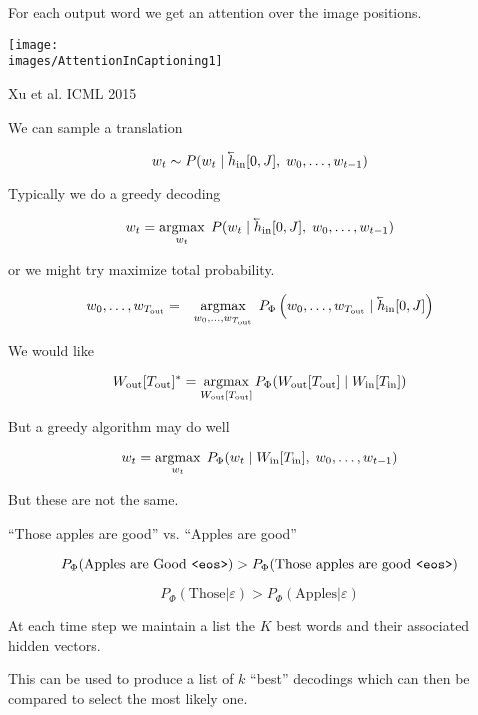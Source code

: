 {\vfill
For each output word we get an attention over the image positions.


\centerline{\texttt{[image: \\images/AttentionInCaptioning1]}}
\centerline{\Large Xu et al. ICML 2015}



We can sample a translation

$$w_t \sim P(w_t\;|\;\cev{h}_{\mathrm{in}}[0,J],\;w_0,\ldots,w_{t-1})$$

\vfill
Typically we do a greedy decoding

$$w_t = \argmax_{w_t}\; P(w_t\;|\;\cev{h}_{\mathrm{in}}[0,J],\;w_0,\ldots,w_{t-1})$$

\vfill
or we might try maximize total probability.

\begin{eqnarray*}
w_0,\ldots,w_{T_{\mathrm{out}}}
& = & \argmax_{w_0,\ldots,w_{T_{\mathrm{out}}}} \;P_\Phi\left(w_0,\ldots,w_{T_{\mathrm{out}}} \;|\; \cev{h}_{\mathrm{in}}[0,J]\right)
\end{eqnarray*}


We would like

\vfill
$$W_{\mathrm{out}}[T_{\mathrm{out}}]^* = \operatorname*{argmax}_{W_{\mathrm{out}}[T_{\mathrm{out}}]}
P_\Phi(W_{\mathrm{out}}[T_{\mathrm{out}}] \;|\;W_{\mathrm{in}}[T_{\mathrm{in}}])$$

\vfill
But a greedy algorithm may do well

\vfill
$$w_t = \operatorname*{argmax}_{w_t}\; P_\Phi(w_t\;|\;W_{\mathrm{in}}[T_{\mathrm{in}}],\;w_0,\ldots,w_{t-1})$$

\vfill
But these are not the same.


``Those apples are good'' vs. ``Apples are good''

\vfill
$$P_\Phi(\mbox{Apples are Good {\tt <eos>}}) > P_\Phi(\mbox{Those apples are good {\tt <eos>}})$$

\vfill
$$P_\Phi(\mbox{Those}|\varepsilon) > P_\Phi(\mbox{Apples}|\varepsilon)$$
    

At each time step we maintain a list the $K$ best words and their associated hidden vectors.

\vfill
This can be used to produce a list of $k$ ``best'' decodings which can then be compared to select
the most likely one.

}

